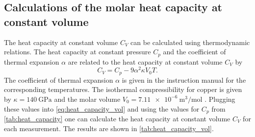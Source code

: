 \subsection{Calculations of the molar heat capacity at constant volume}
\label{sec:heat_capacity_vol}

The heat capacity at constant volume $C_V$ can be calculated using thermodynamic relations. The heat capacity at constant pressure $C_p$ and the coefficient of thermal expansion $\alpha$ are related to the heat capacity at constant volume $C_V$ by
\begin{equation}\label{eq:heat_capacity_vol}
    C_V = C_p - 9 \alpha^2 \kappa V_0 T.
\end{equation}
The coefficient of thermal expansion $\alpha$ is given in the instruction manual \cite{V47} for the corresponding temperatures. The isothermal compressibility for copper is given by $\kappa = \SI{140}{\giga\pascal}$ \cite{isothermal_compressibility} and the molar volume $V_0 = \SI{7.11e-6}{\m\cubed\per\mol}$ \cite{molar_volume_copper}.
Plugging these values into \autoref{eq:heat_capacity_vol} and using the values for $C_p$ from \autoref{tab:heat_capacity} one can calculate the heat capacity at constant volume $C_V$ for each measurement. 
The results are shown in \autoref{tab:heat_capacity_vol}.

